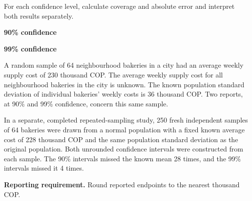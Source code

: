 
For each confidence level, calculate coverage and absolute error and interpret both results separately.
\par\textbf{90\% confidence}\workspace{.65in}
\par\textbf{99\% confidence}\workspace{.65in}
\workspace{.4in}
\vfill


\clearpage
{}
A random sample of 64 neighbourhood bakeries in a city had an average weekly supply cost of 230 thousand COP. The average weekly supply cost for all neighbourhood bakeries in the city is unknown. The known population standard deviation of individual bakeries' weekly costs is 36 thousand COP. Two reports, at 90\% and 99\% confidence, concern this same sample.

In a separate, completed repeated-sampling study, 250 fresh independent samples of 64 bakeries were drawn from a normal population with a fixed known average cost of 228 thousand COP and the same population standard deviation as the original population. Both unrounded confidence intervals were constructed from each sample. The 90\% intervals missed the known mean 28 times, and the 99\% intervals missed it 4 times.

\textbf{Reporting requirement.} Round reported endpoints to the nearest thousand COP.


\BlankInformationTable

\clearpage
{}

